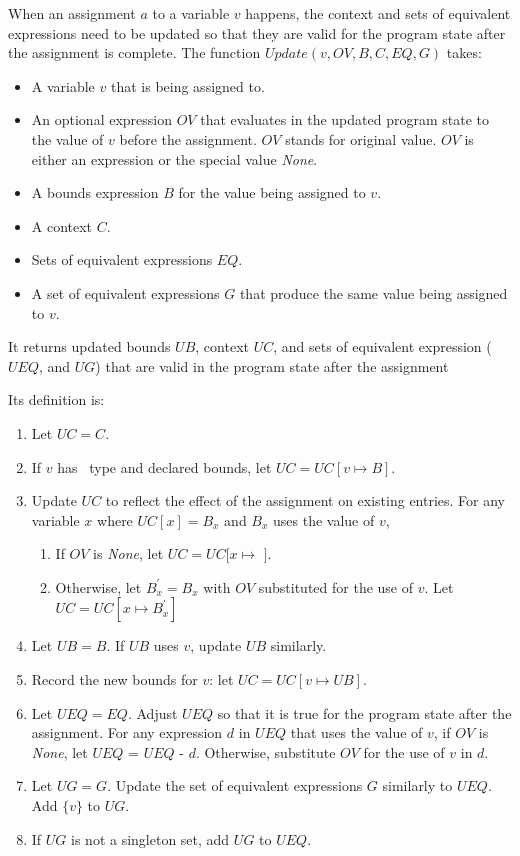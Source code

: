 When an assignment $a$ to a variable $v$ happens, the context and sets of equivalent expressions
need to be updated so that they are valid for the program state after the assignment is complete.
The function $Update(v, OV, B, C, EQ, G)$ takes:
\begin{itemize}
\item A variable $v$ that is being assigned to.
\item An optional expression $OV$
that evaluates in the updated program state to the value of $v$
before the assignment.   $OV$ stands for original value.
$OV$ is either an expression
or the special value {\it None}.
\item A bounds expression $B$ for the value being assigned to $v$.
\item A context $C$.
\item Sets of equivalent expressions $EQ$. 
\item A set of equivalent expressions $G$ that produce the same value being assigned to $v$.
\end{itemize}
It returns updated bounds $UB$, context $UC$, and sets of equivalent expression ($UEQ$, and $UG$)
that are valid in the program state after the assignment

Its definition is:
\begin{enumerate}
\item Let $UC = C$.
\item If $v$ has \arrayptr\ type and declared bounds, let $UC = UC[v \mapsto B]$.
\item Update $UC$ to reflect the effect of the assignment on existing entries.  
For any variable $x$ where $UC[x] = B_x$ and $B_x$ uses the value of $v$,
\begin{enumerate}
\item If $OV$ is {\it None}, let $UC = UC[x \mapsto$ \boundsunknown $]$.
\item  Otherwise, let $B_x^\prime = B_x$ with $OV$ substituted for the use of $v$.
Let $UC = UC[x \mapsto B_x^\prime]$
\end{enumerate}
\item Let $UB = B$.  If $UB$ uses $v$, update $UB$ similarly.
\item Record the new bounds for $v$: let $UC = UC[v \mapsto UB]$.
\item Let $UEQ = EQ$.  Adjust $UEQ$ so that it is true for the program state after the assignment. For any expression $d$ in $UEQ$ that uses the value of $v$, if $OV$ is {\it None}, let $UEQ$ = $UEQ $ - $d$.
Otherwise, substitute $OV$ for the use of $v$ in $d$.
\item Let $UG = G$. Update the set of equivalent expressions $G$ similarly to $UEQ$. Add $\{v\}$ to $UG$.
\item If $UG$ is not a singleton set, add $UG$ to $UEQ$.
\end{enumerate}

